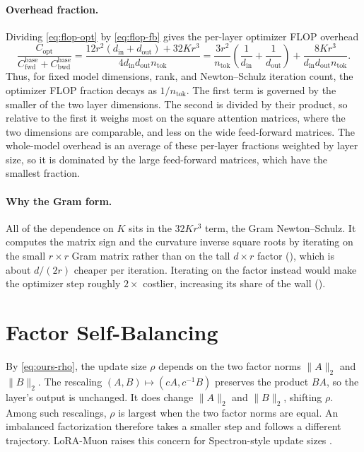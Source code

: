\documentclass[11pt]{article}
\newcommand{\norm}[1]{\| #1\|}
\theoremstyle{plain}
\theoremstyle{definition}
\theoremstyle{remark}
\theoremstyle{definition}
\begin{document}
\paragraph{Overhead fraction.} Dividing \eqref{eq:flop-opt} by \eqref{eq:flop-fb} gives the
per-layer optimizer FLOP overhead 
\begin{equation}
  \frac{C_{\mathrm{opt}}}{C_{\mathrm{fwd}}^{\mathrm{base}}
  +C_{\mathrm{bwd}}^{\mathrm{base}}}
  =
  \frac{
    12r^2(d_{\mathrm{in}}+d_{\mathrm{out}})
    +
    32Kr^3
  }{
    4d_{\mathrm{in}}d_{\mathrm{out}}n_{\mathrm{tok}}
  }
  =
  \frac{3r^2}{n_{\mathrm{tok}}}
  \left(
    \frac1{d_{\mathrm{in}}}
    +
    \frac1{d_{\mathrm{out}}}
  \right)
  +
  \frac{
    8Kr^3
  }{
    d_{\mathrm{in}}d_{\mathrm{out}}n_{\mathrm{tok}}
  } .
  \label{eq:flop-ratio}
\end{equation}
Thus, for fixed model dimensions, rank, and Newton--Schulz iteration count, the
optimizer FLOP fraction decays as $1/n_{\mathrm{tok}}$.
The first term is
governed by the smaller of the two layer dimensions. The second is divided by their product,
so relative to the first it weighs most on the square attention matrices, where the two
dimensions are comparable, and less on the wide feed-forward matrices. 
The whole-model overhead is an average of these per-layer fractions weighted by layer size, so
it is dominated by the large feed-forward matrices, which have the smallest fraction. 

\paragraph{Why the Gram form.} All of the dependence on $K$ sits in the $32Kr^3$ term, the
Gram Newton--Schulz. It computes the matrix sign and the curvature inverse square roots by
iterating on the small $r\times r$ Gram matrix rather than on the tall $d\times r$ factor
(), which is about $d/(2r)$ cheaper per iteration. Iterating on the factor
instead would make the optimizer step roughly $2\times$ costlier, increasing its share of
the wall ().

\section{Factor Self-Balancing}
\label{app:gauge}
By \eqref{eq:ours-rho}, the update size $\rho$ depends on the two factor norms $\norm{A}_2$ and $\norm{B}_2$. The rescaling $(A,B)\mapsto(cA,c^{-1}B)$ preserves the product $BA$, so the layer's output is unchanged. It does change $\norm{A}_2$ and $\norm{B}_2$, shifting $\rho$. Among such rescalings, $\rho$ is largest when the two factor norms are equal. An imbalanced factorization therefore takes a smaller step and follows a different trajectory. LoRA-Muon raises this concern for Spectron-style update sizes \cite{loramuon}.
\end{document}
